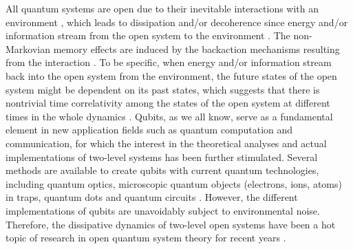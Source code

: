 \documentclass[
showpacs,  %
showkeys,  %
aps,       %
amsthm,    %
amsmath,   %
amsfonts,  %
amssymb    %
]{revtex4-1}          %
\begin{document}
All quantum systems are open due to their inevitable interactions with an environment \cite{Breuer2002}, which leads to dissipation and/or decoherence since energy and/or information stream from the open system to the environment \cite{Breuer2002,Weiss2008}. The non-Markovian memory effects are induced by the backaction mechanisms resulting from the interaction \cite{Caruso2014}. To be specific, when energy and/or information stream back into the open system from the environment, the future states of the open system might be dependent on its past states, which suggests that there is nontrivial time correlativity among the states of the open system at different times in the whole dynamics \cite{Breuer2009,Fanchini2014,Addis2016}. Qubits, as we all know, serve as a fundamental element in new application fields such as quantum computation and communication, for which the interest in the theoretical analyses and actual implementations of two-level systems has been further stimulated. Several methods are available to create qubits with current quantum technologies, including quantum optics, microscopic quantum objects (electrons, ions, atoms) in traps, quantum dots and quantum circuits \cite{Majer2005,Berkley2003,Pashkin2003,Bellomo2007}. However, the different implementations of qubits are unavoidably subject to environmental noise. Therefore, the dissipative dynamics of two-level open systems have been a hot topic of research in open quantum system theory for recent years \cite{Maniscalco2006,Breuer2009,Deffner2013,Teittinen2019,Naikoo2020,Fanchini2022}.
\end{document}
